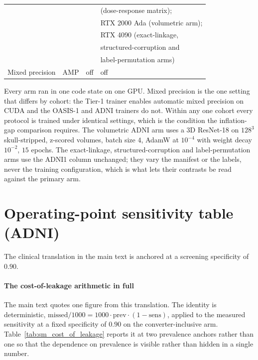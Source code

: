 \documentclass[11pt]{article}
\begin{document}
\begin{table}[!ht]
\begin{tabular}{@{}p{3.2cm}p{3.3cm}p{3.3cm}p{4.3cm}@{}}
         &          &          & (dose-response matrix); \\
         &          &          & RTX 2000 Ada (volumetric arm); \\
         &          &          & RTX 4090 (exact-linkage, \\
         &          &          & structured-corruption and \\
         &          &          & label-permutation arms) \\
Mixed precision & AMP & off & off \\
\bottomrule
\end{tabular}
\end{table}

\noindent
Every arm ran in one code state on one GPU. Mixed precision is the one
setting that differs by cohort: the Tier-1 trainer enables automatic mixed
precision on CUDA and the OASIS-1 and ADNI trainers do not. Within any one
cohort every protocol is trained under identical settings, which is the
condition the inflation-gap comparison requires. The volumetric ADNI arm
uses a 3D ResNet-18 on $128^3$ skull-stripped, z-scored volumes, batch size
$4$, AdamW at $10^{-4}$ with weight decay $10^{-2}$, $15$ epochs. The
exact-linkage, structured-corruption and label-permutation arms use the
ADNI1 column unchanged; they vary the manifest or the labels, never the
training configuration, which is what lets their contrasts be read against
the primary arm.

\section{Operating-point sensitivity table (ADNI)}
\label{sm:operating_point}

The clinical translation in the main text is anchored at a screening
specificity of $0.90$. \paragraph{The cost-of-leakage arithmetic in full}
The main text quotes one figure from this translation. The identity is
deterministic, $\text{missed}/1000 = 1000 \cdot \text{prev} \cdot
(1 - \text{sens})$, applied to the measured sensitivity at a fixed
specificity of $0.90$ on the converter-inclusive arm.
Table~\ref{tab:sm_cost_of_leakage} reports it at
two prevalence anchors rather than one so that the dependence on prevalence
is visible rather than hidden in a single number.
\end{document}

